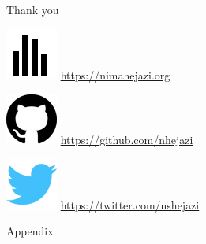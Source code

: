 \documentclass{beamer}
\begin{document}

\begin{frame}[c]{Thank you}

\includegraphics[scale=0.14]{homepage.png} \url{https://nimahejazi.org}

\vspace{2mm}
\includegraphics[scale=0.11]{github-icon.png}
  \url{https://github.com/nhejazi}

\vspace{2mm}
\includegraphics[scale=0.14]{twitter-icon.png}
  \url{https://twitter.com/nshejazi}

\end{frame}


\appendix
\begin{frame}[standout]
  Appendix
\end{frame}

\end{document}
